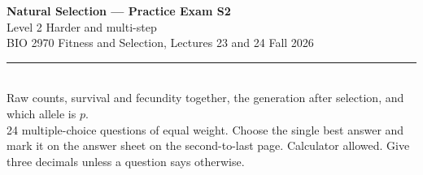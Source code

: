 \documentclass[11pt]{article}
\begin{document}
\begin{center}
  {\LARGE\bfseries Natural Selection --- Practice Exam S2}\\[5pt]
  {\large Level 2 \quad\textbullet\quad Harder and multi-step}\\[6pt]
  BIO 2970 \quad\textbullet\quad Fitness and Selection, Lectures 23 and 24 \quad\textbullet\quad Fall 2026\\[3pt]
  \rule{\textwidth}{0.8pt}\\[3pt]
  {\small Raw counts, survival and fecundity together, the generation after selection, and which allele is \(p\).\\[2pt] 24 multiple-choice questions of equal weight. Choose the single best answer and mark it on the answer sheet on the second-to-last page. Calculator allowed. Give three decimals unless a question says otherwise.}
\end{center}
\vspace{0.4em}
\end{document}
